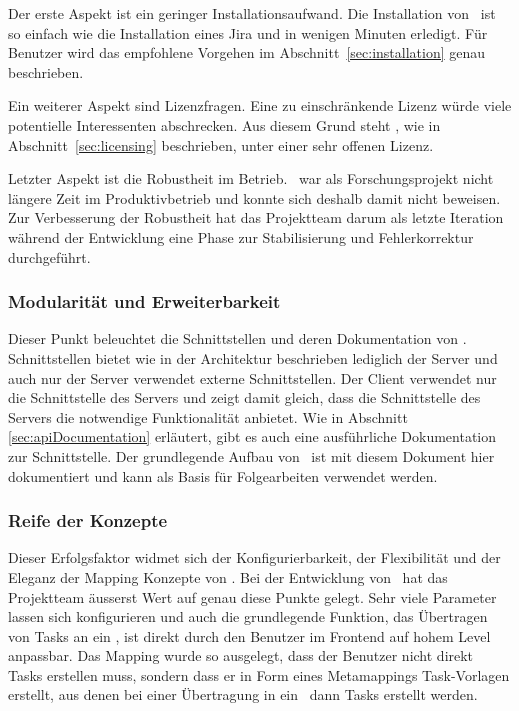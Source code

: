 			Der erste Aspekt ist ein geringer Installationsaufwand.
			Die Installation von \eeppi\ ist so einfach wie  die Installation eines Jira und in wenigen Minuten erledigt. 
			Für Benutzer wird das empfohlene Vorgehen im Abschnitt\ \ref{sec:installation} genau beschrieben.
			
			Ein weiterer Aspekt sind Lizenzfragen.
			Eine zu einschränkende Lizenz würde viele potentielle Interessenten abschrecken.
			Aus diesem Grund steht \eeppi, wie in Abschnitt\ \ref{sec:licensing} beschrieben, unter einer sehr offenen Lizenz.
			
			Letzter Aspekt ist die Robustheit im Betrieb.
			\eeppi\ war als Forschungsprojekt nicht längere Zeit im Produktivbetrieb
			und konnte sich deshalb damit nicht beweisen.
			Zur Verbesserung der Robustheit hat das Projektteam darum als letzte Iteration während der Entwicklung eine Phase zur Stabilisierung und Fehlerkorrektur durchgeführt.
		
		
		\subsubsection{Modularität und Erweiterbarkeit}
			Dieser Punkt beleuchtet die Schnittstellen und deren Dokumentation von \eeppi.
			Schnittstellen bietet wie in der Architektur beschrieben lediglich der Server
			und auch nur der Server verwendet externe Schnittstellen.
			Der Client verwendet nur die Schnittstelle des Servers
			und zeigt damit gleich, dass die Schnittstelle des Servers die notwendige Funktionalität anbietet.
			Wie in Abschnitt \ref{sec:apiDocumentation} erläutert, gibt es auch eine ausführliche Dokumentation zur Schnittstelle.
			Der grundlegende Aufbau von \eeppi\ ist mit diesem Dokument hier dokumentiert
			und kann als Basis für Folgearbeiten verwendet werden.
			
			
		\subsubsection{Reife der Konzepte}
			Dieser Erfolgsfaktor widmet sich der Konfigurierbarkeit, der Flexibilität und der Eleganz der Mapping Konzepte von \eeppi.
			Bei der Entwicklung von \eeppi\ hat das Projektteam äusserst Wert auf genau diese Punkte gelegt.
			Sehr viele Parameter lassen sich konfigurieren und auch die grundlegende Funktion,
			das Übertragen von Tasks an ein \ppt, ist direkt durch den Benutzer im Frontend auf hohem Level anpassbar.
			Das Mapping wurde so ausgelegt, dass der Benutzer nicht direkt Tasks erstellen muss,
			sondern dass er in Form eines Metamappings Task-Vorlagen erstellt,
			aus denen bei einer Übertragung in ein \ppt\ dann Tasks erstellt werden.
			
